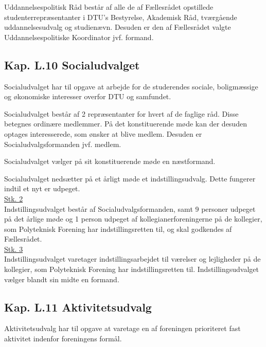 \item Uddannelsespolitisk Råd består af alle de af Fællesrådet opstillede studenterrepræsentanter i DTU’s Bestyrelse, Akademisk Råd, tværgående uddannelsesudvalg og studienævn. Desuden er den af Fællesrådet valgte Uddannelsespolitiske Koordinator jvf.  formand.\\

\subsection*{Kap. L.10 Socialudvalget}
\label{L:kap:socialudvalg}
\item Socialudvalget har til opgave at arbejde for de studerendes sociale, boligmæssige og økonomiske interesser overfor DTU og samfundet.\\

\item Socialudvalget består af 2 repræsentanter for hvert af de faglige råd. Disse betegnes ordinære medlemmer. På det konstituerende møde kan der desuden optages interesserede, som ønsker at blive medlem. Desuden er Socialudvalgsformanden jvf.  medlem.\\

\item Socialudvalget vælger på sit konstituerende møde en næstformand.\\

\item Socialudvalget nedsætter på et årligt møde et indstillingsudvalg. Dette fungerer indtil et nyt er udpeget.\\

\underline{Stk. 2} \\
Indstillingsudvalget består af Socialudvalgsformanden, samt 9 personer udpeget på det årlige møde og 1 person udpeget af kollegianerforeningerne på de kollegier, som Polyteknisk Forening har indstillingsretten til, og skal godkendes af Fællesrådet.\\

\underline{Stk. 3} \\
Indstillingsudvalget varetager indstillingsarbejdet til værelser og lejligheder på de kollegier, som Polyteknisk Forening har indstillingsretten til. Indstillingsudvalget vælger blandt sin midte en formand.



\subsection*{Kap. L.11 Aktivitetsudvalg}
\label{L:kap:aktivitetsudvalg}
\item Aktivitetsudvalg har til opgave at varetage en af foreningen prioriteret fast aktivitet indenfor foreningens formål.

